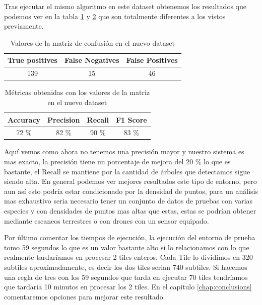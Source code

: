 Tras ejecutar el mismo algoritmo en este dataset obtenemos los resultados que podemos ver en la tabla \ref{tablaconf2} y \ref{tablaMetr2} que son totalmente diferentes a los vistos previamente.

\begin{table}[!h]
\centering
{}
\begin{tabular}{c|c|c}
\rowcolor{udcpink!25}
\textbf{True positives} & \textbf{False Negatives} & \textbf{False Positives} \\\hline
139 & 15 & 46 \\
\end{tabular}
\caption{Valores de la matriz de confusión en el nuevo dataset}
\label{tablaconf2}
\end{table}
\begin{table}[!h]
\centering
{}
\begin{tabular}{c|c|c|c}
\rowcolor{udcpink!25}
\textbf{Accuracy} & \textbf{Precision} & \textbf{Recall} & \textbf{F1 Score} \\\hline
72 \% & 82 \% & 90 \% & 83 \% \\
\end{tabular}
\caption{Métricas obtenidas con los valores de la matriz en el nuevo dataset}
\label{tablaMetr2}
\end{table}

Aquí vemos como ahora no tenemos una precisión mayor y nuestro sistema es mas exacto, la precisión tiene un porcentaje de mejora del 20 \% lo que es bastante, el Recall se mantiene por la cantidad de árboles que detectamos sigue siendo alta. En general podemos ver mejores resultados este tipo de entorno, pero aun así esto podría estar condicionado por la densidad de puntos, para un análisis mas exhaustivo seria necesario tener un conjunto de datos de pruebas con varias especies y con densidades de puntos mas altas que estas, estas se podrían obtener mediante escaneos terrestres o con drones con un sensor equipado.

Por último comentar los tiempos de ejecución, la ejecución del entorno de prueba tomo 59 segundos lo que es un valor bastante alto si lo relacionamos con lo que realmente tardaríamos en procesar 2 tiles enteros.
Cada Tile lo dividimos en 320 subtiles aproximadamente, es decir los dos tiles serian 740 subtiles. Si hacemos una regla de tres con los 59 segundos que tarda en ejecutar 70 tiles tendríamos que tardaría 10 minutos en procesar los 2 tiles. En el capitulo \ref{chap:conclusions} comentaremos opciones para mejorar este resultado.


